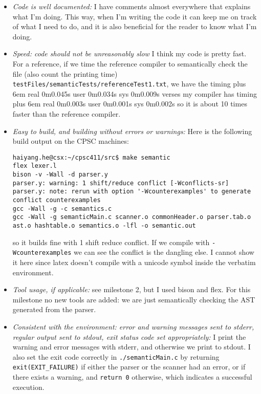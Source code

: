 \documentclass{article}
\makeatletter
\newenvironment{myverb}
 {\def\@xobeysp{\ }\verbatim\rightskip=0pt plus 6em\relax}
 {\endverbatim}
\makeatother
\begin{document}
\begin{itemize}
    \item \emph{Code is well documented: } 
        I have comments almost everywhere that explains what I'm doing. This way, when I'm writing the code it can keep me on track of what I need to do, and it is also beneficial for the reader to know what I'm doing.

    \item \emph{Speed: code should not be unreasonably slow}
        I think my code is pretty fast. For a reference, if we time the reference compiler to semantically check the file (also count the printing time) \verb|testFiles/semanticTests/referenceTest1.txt|, we have the timing
        \begin{myverb}
real	0m0.045s
user	0m0.034s
sys	    0m0.009s
        \end{myverb}
        verses my compiler has timing
        \begin{myverb}
real	0m0.003s
user	0m0.001s
sys	    0m0.002s
        \end{myverb}
        so it is about 10 times faster than the reference compiler.

    \item \emph{Easy to build, and building without errors or warnings:}
        Here is the following build output on the CPSC machines:
        \begin{verbatim}
haiyang.he@csx:~/cpsc411/src$ make semantic
flex lexer.l
bison -v -Wall -d parser.y
parser.y: warning: 1 shift/reduce conflict [-Wconflicts-sr]
parser.y: note: rerun with option '-Wcounterexamples' to generate conflict counterexamples
gcc -Wall -g -c semantics.c
gcc -Wall -g semanticMain.c scanner.o commonHeader.o parser.tab.o ast.o hashtable.o semantics.o -lfl -o semantic.out
        \end{verbatim}
        so it builds fine with 1 shift reduce conflict. If we compile with \verb|-Wcounterexamples| we can see the conflict is the dangling else. 
        I cannot show it here since latex doesn't compile with a unicode symbol inside the verbatim environment.

    \item \emph{Tool usage, if applicable: } 
        see milestone 2, but I used bison and flex. For this milestone no new tools are added: we are just semantically checking the AST generated from the parser.

    \item \emph{Consistent with the environment: error and warning messages sent to stderr, regular output sent to stdout, exit status code set appropriately:} 
        I print the warning and error messages with stderr, and otherwise we print to stdout. I also set the exit code correctly in \verb|./semanticMain.c| by returning \verb|exit(EXIT_FAILURE)| if either the parser or the scanner had an error, or if there exists a warning, and \verb|return 0| otherwise, which indicates a successful execution.


\end{itemize}
\end{document}
